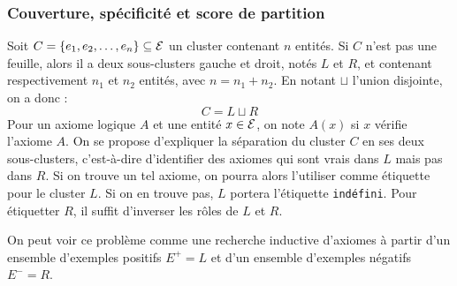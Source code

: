 \subsubsection{Couverture, spécificité et score de partition}
Soit $C = \{e_1, e_2, \ldots, e_n \} \subseteq \mathcal{E}$ un cluster contenant $n$ entités. Si $C$ n'est pas une feuille, alors il a deux sous-clusters gauche et droit, notés $L$ et $R$, et contenant respectivement $n_1$ et $n_2$ entités, avec $n = n_1 + n_2$. En notant $\sqcup$ l'union disjointe, on a donc :
\begin{equation}
C = L \sqcup R
\end{equation}
Pour un axiome logique $A$ et une entité $x \in \mathcal{E}$, on note $A(x)$ si $x$ vérifie l'axiome $A$. On se propose d'expliquer la séparation du cluster $C$ en ses deux sous-clusters, c'est-à-dire d'identifier des axiomes qui sont vrais dans $L$ mais pas dans $R$. Si on trouve un tel axiome, on pourra alors l'utiliser comme étiquette pour le cluster $L$. Si on en trouve pas, $L$ portera l'étiquette \texttt{indéfini}. Pour étiquetter $R$, il suffit d'inverser les rôles de $L$ et $R$.

On peut voir ce problème comme une recherche inductive d'axiomes à partir d'un ensemble d'exemples positifs $E^+ = L$ et d'un ensemble d'exemples négatifs $E^- = R$. 


